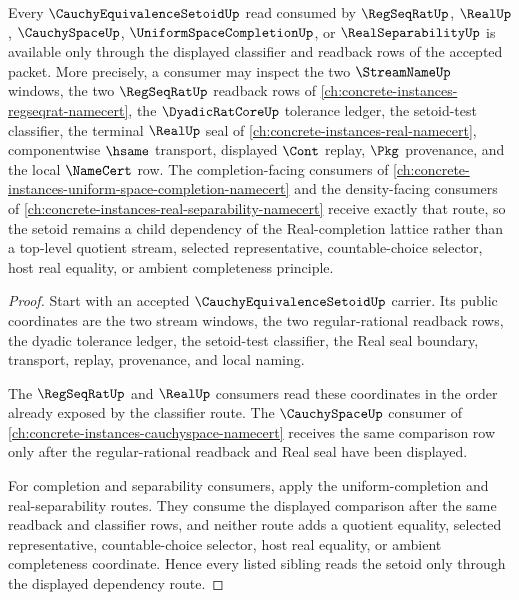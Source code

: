 \begin{theorem}
\label{thm:cauchy-equivalence-setoid-completion-real-dependency-readback}
Every $\CauchyEquivalenceSetoidUp$ read consumed by $\RegSeqRatUp$, $\RealUp$, $\CauchySpaceUp$, $\UniformSpaceCompletionUp$, or $\RealSeparabilityUp$ is available only through the displayed classifier and readback rows of the accepted packet. More precisely, a consumer may inspect the two $\StreamNameUp$ windows, the two $\RegSeqRatUp$ readback rows of \autoref{ch:concrete-instances-regseqrat-namecert}, the $\DyadicRatCoreUp$ tolerance ledger, the setoid-test classifier, the terminal $\RealUp$ seal of \autoref{ch:concrete-instances-real-namecert}, componentwise $\hsame$ transport, displayed $\Cont$ replay, $\Pkg$ provenance, and the local $\NameCert$ row. The completion-facing consumers of \autoref{ch:concrete-instances-uniform-space-completion-namecert} and the density-facing consumers of \autoref{ch:concrete-instances-real-separability-namecert} receive exactly that route, so the setoid remains a child dependency of the Real-completion lattice rather than a top-level quotient stream, selected representative, countable-choice selector, host real equality, or ambient completeness principle.
\end{theorem}
\begin{proof}
Start with an accepted $\CauchyEquivalenceSetoidUp$ carrier. Its public coordinates are the two stream windows, the two regular-rational readback rows, the dyadic tolerance ledger, the setoid-test classifier, the Real seal boundary, transport, replay, provenance, and local naming.

The $\RegSeqRatUp$ and $\RealUp$ consumers read these coordinates in the order already exposed by the classifier route. The $\CauchySpaceUp$ consumer of \autoref{ch:concrete-instances-cauchyspace-namecert} receives the same comparison row only after the regular-rational readback and Real seal have been displayed.

For completion and separability consumers, apply the uniform-completion and real-separability routes. They consume the displayed comparison after the same readback and classifier rows, and neither route adds a quotient equality, selected representative, countable-choice selector, host real equality, or ambient completeness coordinate. Hence every listed sibling reads the setoid only through the displayed dependency route.
\end{proof}
